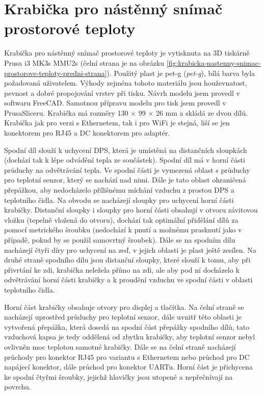\section{Krabička pro nástěnný snímač prostorové teploty}
Krabička pro nástěnný snímač prostorové teploty je vytisknuta na 3D tiskárně Prusa i3 MK3s MMU2s (čelní strana je na obrázku \ref{fig:krabicka-nastenny-snimac-prostorove-teploty-predni-strana}). Použitý plast je \acrshort{pet-g} (\textit{\acrlong{pet-g}}), bílá barva byla požadovaná uživatelem. Výhody zejména tohoto materiálu jsou houževnatost, pevnost a dobré propojování vrstev při tisku. Návrh modelu jsem provedl v softwaru FreeCAD. Samotnou přípravu modelu pro tisk jsem provedl v  PrusaSliceru. Krabička má rozměry 130 × 99 × 26 mm a skládá ze dvou dílů. Krabička jak pro verzi s Ethernetem, tak i pro WiFi je stejná, liší se jen konektorem pro RJ45 a DC konektorem pro adaptér.

Spodní díl slouží k uchycení DPS, která je umístěná na distančních sloupkách (dochází tak k lépe odvádění tepla ze součástek). Spodní díl má v horní části průduchy na odvětrávání tepla. Ve spodní části je vymezená oblast s průduchy pro teplotní senzor, který se nachází nad nimi. Dále je tato oblast ohraničená přepážkou, aby nedocházelo přílišnému míchání vzduchu z prostou DPS a teplotního čidla. Na obvodu se nacházejí sloupky pro uchycení horní části krabičky. Distanční sloupky i sloupky pro horní části obsahují v otvoru závitovou vložku (tepelně vložená do otvoru), dochází tak optimální přidělání dílů za pomocí metrického šroubku (nedochází k pnutí a možnému prasknutí jako v případě, pokud by se použil samovrtný šroubek). Dále se na spodním dílu nacházejí čtyři díry pro uchycení na zeď, v jejich oblasti je plast ještě zesílen. Na druhé straně spodního dílu jsou distanční sloupky, které slouží k tomu, aby při přivrtání ke zdi, krabička neležela přímo na zdi, ale aby pod ní docházelo k odvětrávání horní části krabičky a k proudění vzduchu ve spodní části v oblasti teplotního čidla.

Horní část krabičky obsahuje otvory pro displej a tlačítka. Na čelní straně se nacházejí uprostřed průduchy pro teplotní senzor, dále uvnitř této oblasti je vytvořená přepážka, která dosedá na spodní část přepážky spodního dílů, tato vzduchová kapsa je tedy oddělená od zbytku krabičky, aby teplotní senzor nebyl ovlivněn moc teplotou samotné krabičky. Dále se na čelní straně nacházejí průchody pro konektor RJ45 pro variantu s Ethernetem nebo průchod pro DC napájecí konektor, dále průchod pro konektor UARTu. Horní část je přichycena ke spodní čtyřmi šroubky, jejichž hlavičky jsou utopené a nepřečnívají na povrchu.

